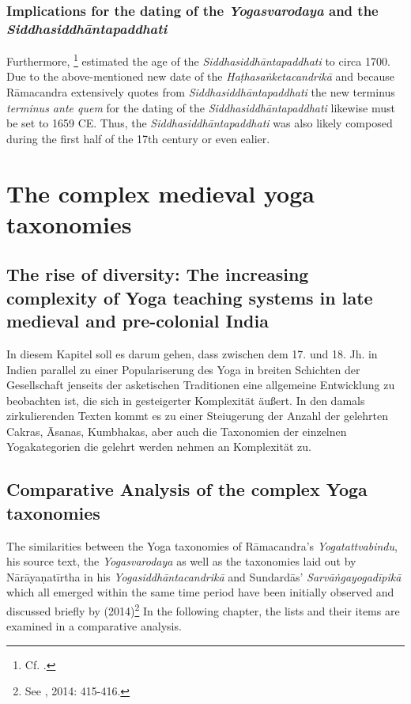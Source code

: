 \subsection{Implications for the dating of the \textit{Yogasvarodaya} and the \textit{Siddhasiddhāntapaddhati}}
Furthermore, \citeauthor{mallinsononline2013}\footnote{Cf. .} estimated the age of the \textit{Siddhasiddhāntapaddhati} to circa 1700. Due to the above-mentioned new date of the \textit{Haṭhasaṅketacandrikā} and because Rāmacandra extensively quotes from \textit{Siddhasiddhāntapaddhati} the new terminus \textit{terminus ante quem} for the dating of the \textit{Siddhasiddhāntapaddhati} likewise must be set to 1659 CE. Thus, the \textit{Siddhasiddhāntapaddhati} was also likely composed during the first half of the 17th century or even ealier.

\chapter{The complex medieval yoga taxonomies}
\label{yogas_list}
\clearpage


\section{The rise of diversity: The increasing complexity of Yoga teaching systems in late medieval and pre-colonial India}

In diesem Kapitel soll es darum gehen, dass zwischen dem 17. und 18. Jh. in Indien parallel zu einer Populariserung des Yoga in breiten Schichten der Gesellschaft jenseits der asketischen Traditionen eine allgemeine Entwicklung zu beobachten ist, die sich in gesteigerter Komplexität äußert. In den damals zirkulierenden Texten kommt es zu einer Steiugerung der Anzahl der gelehrten Cakras, Āsanas, Kumbhakas, aber auch die Taxonomien der einzelnen Yogakategorien die gelehrt werden nehmen an Komplexität zu. 


\section{Comparative Analysis of the complex Yoga taxonomies}

The similarities between the Yoga taxonomies of Rāmacandra's \textit{Yogatattvabindu}, his source text, the \textit{Yogasvarodaya} as well as the taxonomies laid out by Nārāyaṇatīrtha in his \textit{Yogasiddhāntacandrikā} and Sundardās' \textit{Sarvāṅgayogadīpikā} which all emerged within the same time period have been initially observed and discussed briefly by \citeauthor{birch2014} (2014)\footnote{See \citeauthor{birch2014}, 2014: 415-416.} In the following chapter, the lists and their items are examined in a comparative analysis.

